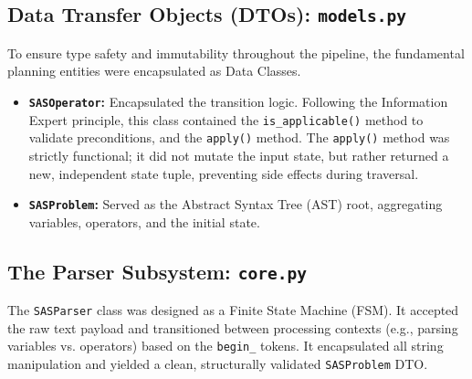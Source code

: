 \subsection{Data Transfer Objects (DTOs): \texttt{models.py}}
To ensure type safety and immutability throughout the pipeline, the fundamental planning entities were encapsulated as Data Classes. 
\begin{itemize}
    \item \textbf{\texttt{SASOperator}:} Encapsulated the transition logic. Following the Information Expert principle, this class contained the \texttt{is\_applicable()} method to validate preconditions, and the \texttt{apply()} method. The \texttt{apply()} method was strictly functional; it did not mutate the input state, but rather returned a new, independent state tuple, preventing side effects during traversal.
    \item \textbf{\texttt{SASProblem}:} Served as the Abstract Syntax Tree (AST) root, aggregating variables, operators, and the initial state.
\end{itemize}

\subsection{The Parser Subsystem: \texttt{core.py}}
The \texttt{SASParser} class was designed as a Finite State Machine (FSM). It accepted the raw text payload and transitioned between processing contexts (e.g., parsing variables vs. operators) based on the \texttt{begin\_} tokens. It encapsulated all string manipulation and yielded a clean, structurally validated \texttt{SASProblem} DTO.

